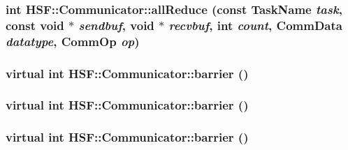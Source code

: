 \label{classHSF_1_1Communicator_aa89f31910f7d7f51549ef73acde75236}
\hypertarget{classHSF_1_1Communicator_a510bb4c1d745693f8dabcbdc9694b782}{
\subsubsection[{allReduce}]{\setlength{\rightskip}{0pt plus 5cm}int HSF::Communicator::allReduce (const {\bf TaskName} {\em task}, \/  const void $\ast$ {\em sendbuf}, \/  void $\ast$ {\em recvbuf}, \/  int {\em count}, \/  CommData {\em datatype}, \/  CommOp {\em op})}}
\label{classHSF_1_1Communicator_a510bb4c1d745693f8dabcbdc9694b782}
\hypertarget{classHSF_1_1Communicator_a268366a86ccbb00d630b9b660a02b7c2}{
\subsubsection[{barrier}]{\setlength{\rightskip}{0pt plus 5cm}virtual int HSF::Communicator::barrier ()}}
\label{classHSF_1_1Communicator_a268366a86ccbb00d630b9b660a02b7c2}
\hypertarget{classHSF_1_1Communicator_a268366a86ccbb00d630b9b660a02b7c2}{
\subsubsection[{barrier}]{\setlength{\rightskip}{0pt plus 5cm}virtual int HSF::Communicator::barrier ()}}
\label{classHSF_1_1Communicator_a268366a86ccbb00d630b9b660a02b7c2}
\hypertarget{classHSF_1_1Communicator_a268366a86ccbb00d630b9b660a02b7c2}{
\subsubsection[{barrier}]{\setlength{\rightskip}{0pt plus 5cm}virtual int HSF::Communicator::barrier ()}}
